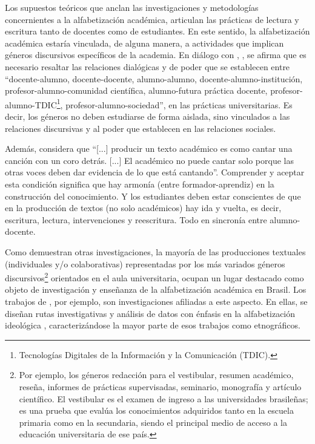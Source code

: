 \documentclass[spanish]{textolivre}
\begin{document}
Los supuestos teóricos que anclan las investigaciones y metodologías concernientes a la alfabetización académica, articulan las prácticas de lectura y escritura tanto de docentes como de estudiantes. En este sentido, la alfabetización académica estaría vinculada, de alguna manera, a actividades que implican géneros discursivos específicos de la academia. En diálogo con \textcite{lillis_student_2003}, \textcite[p. 37]{fiad_letramentos_2014}, se afirma que es necesario resaltar las relaciones dialógicas y de poder que se establecen entre “docente-alumno, docente-docente, alumno-alumno, docente-alumno-institución, profesor-alumno-comunidad científica, alumno-futura práctica docente, profesor-alumno-TDIC\footnote{Tecnologías Digitales de la Información y la Comunicación (TDIC).}, profesor-alumno-sociedad”, en las prácticas universitarias. Es decir, los géneros no deben estudiarse de forma aislada, sino vinculados a las relaciones discursivas \cite{lillis_student_2003} y al poder que establecen en las relaciones sociales.

Además, \textcite[p. 76]{zavala_quem_2010} considera que “[...] producir un texto académico es como cantar una canción con un coro detrás. [...] El académico no puede cantar solo porque las otras voces deben dar evidencia de lo que está cantando”. Comprender y aceptar esta condición significa que hay armonía (entre formador-aprendiz) en la construcción del conocimiento. Y los estudiantes deben estar conscientes de que en la producción de textos (no solo académicos) hay ida y vuelta, es decir, escritura, lectura, intervenciones y reescritura. Todo en sincronía entre alumno-docente.

Como demuestran otras investigaciones, la mayoría de las producciones textuales (individuales y/o colaborativas) representadas por los más variados géneros discursivos\footnote{Por ejemplo, los géneros redacción para el vestibular, resumen académico, reseña, informes de prácticas supervisadas, seminario, monografía y artículo científico. El vestibular es el examen de ingreso a las universidades brasileñas; es una prueba que evalúa los conocimientos adquiridos tanto en la escuela primaria como en la secundaria, siendo el principal medio de acceso a la educación universitaria de ese país.} orientados en el aula universitaria, ocupan un lugar destacado como objeto de investigación y enseñanza de la alfabetización académica en Brasil. Los trabajos de \textcite{marinho_escrita_2010, araujo_2013, fiad_letramentos_2014, santos_letramento_2020}, por ejemplo, son investigaciones afiliadas a este aspecto. En ellas, se diseñan rutas investigativas y análisis de datos con énfasis en la alfabetización ideológica \cite{street_literacy_1984, street_letramentos_2014}, caracterizándose la mayor parte de esos trabajos como etnográficos.
\end{document}
